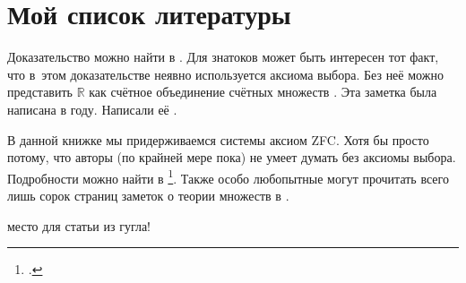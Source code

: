 \documentclass[12pt, a4paper]{article}
\theoremstyle{plain}              %
\theoremstyle{definition}         %
\begin{document}
\section{Мой список литературы} 

Доказательство можно найти в \cite{Shan:sets}. Для знатоков может быть интересен тот факт, что в~этом доказательстве неявно используется аксиома выбора. Без неё можно представить $\mathbb{R}$ как счётное объединение счётных множеств \parencite{williams:wto}. Эта заметка была написана в \citeyear{williams:wto} году. Написали её \citeauthor{williams:wto}.

В данной книжке мы придерживаемся системы аксиом ZFC. Хотя бы просто потому, что авторы (по крайней мере пока) не умеет думать без аксиомы выбора. Подробности можно найти в \footcite{herrlich:axiom}. Также особо любопытные могут прочитать всего лишь сорок страниц заметок о теории множеств в \textcite{Franclin:sets}.

\nocite{*}    место для статьи из гугла!


\printbibliography
\end{document}
